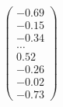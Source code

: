 \documentclass[preview]{standalone}
\begin{document}
\begin{align*}
\begin{pmatrix} -0.69 \\ -0.15 \\ -0.34 \\ \dots \\ 0.52 \\ -0.26 \\ -0.02 \\ -0.73 \end{pmatrix}
\end{align*}
\end{document}
